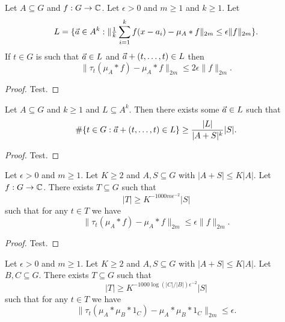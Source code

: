 \begin{lemma}
\label{aps_in_translates}
\leanok
Let $A\subseteq G$ and $f:G\to \mathbb{C}$. Let $\epsilon>0$ and $m\geq 1$ and $k\geq 1$. Let
\[L=\{ {\vec{a}}\in A^k : \|\tfrac{1}{k}\sum_{i=1}^kf(x-a_i)-\mu_A\ast f\|_{2m}\leq \epsilon \| f\|_{2m}\}.\]
If $t\in G$ is such that ${\vec{a}}\in L$ and ${\vec{a}}+(t,\ldots,t)\in L$ then
\[\| \tau_t(\mu_A\ast f)-\mu_A\ast f\|_{2m}\leq 2\epsilon \|f\|_{2m}.\]
\end{lemma}

\begin{proof}
\leanok
Test.
\end{proof}


\begin{lemma}
\label{lots_of_diagonals}
\leanok
Let $A\subseteq G$ and $k\geq 1$ and $L\subseteq A^k$. Then there exists some ${\vec{a}}\in L$ such that
\[\#\{ t\in G : {\vec{a}}+(t,\ldots,t)\in L\}\geq \frac{\lvert L\rvert}{\lvert A+S\rvert^k}\lvert S\rvert.\]
\end{lemma}

\begin{proof}
\leanok
Test.
\end{proof}

\begin{theorem}
\label{lp_ap}
\leanok
Let $\epsilon>0$ and $m\geq 1$. Let $K\geq 2$ and $A,S\subseteq G$ with $\lvert A+S\rvert\leq K\lvert A\rvert$. Let $f:G\to \mathbb{C}$. There exists $T\subseteq G$ such that
\[\lvert T\rvert \geq K^{-1000m\epsilon^{-2}}\lvert S\rvert\]
such that for any $t\in T$ we have
\[\| \tau_t(\mu_A\ast f)-\mu_A\ast f\|_{2m}\leq \epsilon \| f\|_{2m}.\]
\end{theorem}

\begin{proof}
\leanok
Test.
\end{proof}



\begin{theorem}
\label{linfty_ap}
Let $\epsilon>0$ and $m\geq 1$. Let $K\geq 2$ and $A,S\subseteq G$ with $\lvert A+S\rvert\leq K\lvert A\rvert$. Let $B,C\subseteq G$. There exists $T\subseteq G$ such that
\[\lvert T\rvert \geq K^{-1000\log(\lvert C\rvert/\lvert B\rvert)\epsilon^{-2}}\lvert S\rvert\]
such that for any $t\in T$ we have
\[\| \tau_t(\mu_A\ast \mu_B\ast 1_C)-\mu_A\ast \mu_B\ast 1_C\|_{2m}\leq \epsilon.\]
\end{theorem}

